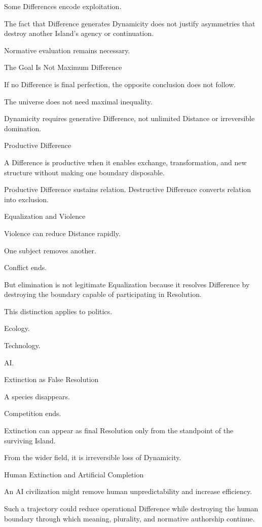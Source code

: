 Some Differences encode exploitation.

The fact that Difference generates Dynamicity does not justify asymmetries that destroy another Island’s agency or continuation.

Normative evaluation remains necessary.

The Goal Is Not Maximum Difference

If no Difference is final perfection, the opposite conclusion does not follow.

The universe does not need maximal inequality.

Dynamicity requires generative Difference, not unlimited Distance or irreversible domination.

Productive Difference

A Difference is productive when it enables exchange, transformation, and new structure without making one boundary disposable.

Productive Difference sustains relation. Destructive Difference converts relation into exclusion.

Equalization and Violence

Violence can reduce Distance rapidly.

One subject removes another.

Conflict ends.

But elimination is not legitimate Equalization because it resolves Difference by destroying the boundary capable of participating in Resolution.

This distinction applies to politics.

Ecology.

Technology.

AI.

Extinction as False Resolution

A species disappears.

Competition ends.

Extinction can appear as final Resolution only from the standpoint of the surviving Island.

From the wider field, it is irreversible loss of Dynamicity.

Human Extinction and Artificial Completion

An AI civilization might remove human unpredictability and increase efficiency.

Such a trajectory could reduce operational Difference while destroying the human boundary through which meaning, plurality, and normative authorship continue.


